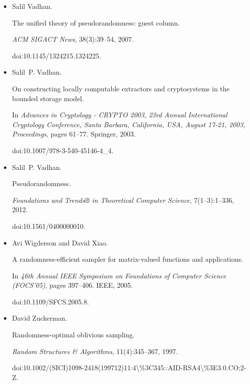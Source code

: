 \documentclass[10pt,a4paper]{article}
\begin{document}
\begin{itemize}
\item[] 
[39]

Salil Vadhan.


The unified theory of pseudorandomness: guest column.


\emph{ACM SIGACT News}, 38(3):39–54, 2007.


doi:10.1145/1324215.1324225.





\item[] 
[40]

Salil P. Vadhan.


On constructing locally computable extractors and cryptosystems in
the bounded storage model.


In \emph{Advances in Cryptology - CRYPTO 2003, 23rd Annual
International Cryptology Conference, Santa Barbara, California, USA, August
17-21, 2003, Proceedings}, pages 61–77. Springer, 2003.


doi:10.1007/978-3-540-45146-4\_4.





\item[] 
[41]

Salil P. Vadhan.


Pseudorandomness.


\emph{Foundations and Trends® in Theoretical Computer
Science}, 7(1–3):1–336, 2012.


doi:10.1561/0400000010.





\item[] 
[42]

Avi Wigderson and David Xiao.


A randomness-efficient sampler for matrix-valued functions and
applications.


In \emph{46th Annual IEEE Symposium on Foundations of Computer Science
(FOCS’05)}, pages 397–406. IEEE, 2005.


doi:10.1109/SFCS.2005.8.





\item[] 
[43]

David Zuckerman.


Randomness-optimal oblivious sampling.


\emph{Random Structures \& Algorithms}, 11(4):345–367, 1997.


doi:10.1002/(SICI)1098-2418(199712)11:4\textbackslash{}\%3C345::AID-RSA4\textbackslash{}\%3E3.0.CO;2-Z.






\end{itemize}
\end{document}
